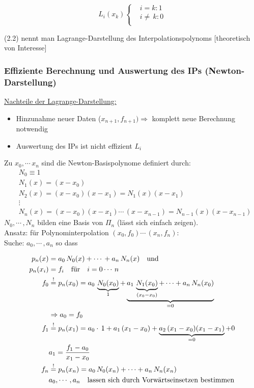 \begin{equation*} 
  L_i(x_k)
	\left\{  
  \begin{aligned} 
   & i=k: 1 \\ 
   & i\neq\,k: 0\\
  \end{aligned} 
	\right.
\end{equation*} 

(2.2) nennt man Lagrange-Darstellung des Interpolationspolynoms [theoretisch von Interesse]

\subsubsection{Effiziente Berechnung und Auswertung des IPs (Newton-Darstellung)}
\underline{Nachteile der Lagrange-Darstellung:}

\begin{itemize}
	\item Hinzunahme neuer Daten ($x_{n+1},f_{n+1}) \Rightarrow$ komplett neue Berechnung notwendig
	\item Auswertung des IPs ist nicht effizient $L_i$
\end{itemize}

Zu $x_0,\cdots\,x_n$ sind die Newton-Basispolynome definiert durch:\\

\begin{align*}
&N_0 \equiv 1\\
&N_1(x) = (x-x_0)\\
&N_2(x) = (x-x_0)(x-x_1)=N_1(x)(x-x_1)\\
&\vdots \\
&N_n(x) = (x-x_0)(x-x_1)\cdots\,(x-x_{n-1})=N_{n-1}(x)(x-x_{n-1})
\end{align*}
$N_0,\cdots\,,N_n$ bilden eine Basis von $\Pi_n$ (lässt sich einfach zeigen).\\
Ansatz: für Polynominterpolation $(x_0,f_0)\cdots\,(x_n,f_n)$:\\
Suche: $a_0,\cdots\,,a_n$ so dass 

\begin{align*}
p_n(x)&=a_0\,N_0(x) + \cdots\, + a_n\,N_n(x) \quad \text{und} \\
p_n(x_i)&= f_i \quad \text{für} \quad i=0\cdots\,n \\
f_0 &\overset{!}{=} p_n(x_0) = a_0\,\underbrace{N_0(x_0)}_{1} + \underbrace{a_1\,\underbrace{N_1(x_0)}_{(x_0-x_0)} + \cdots + a_n\,N_n(x_0)}_{=0} \\
& \Rightarrow a_0 = f_0 \\
f_1 &\overset{!}{=} p_n(x_1) = a_0\cdot\,1 + a_1\,(x_1-x_0) + \underbrace{a_2\,(x_1-x_0)(x_1-x_1)}_{=0} + 0  \\
& a_1 = \frac{f_1-a_0}{x_1-x_0}\\
f_n &\overset{!}{=} p_n(x_n) = a_0\,N_0(x_n) + \cdots + a_n\,N_n(x_n) \\
& a_0,\cdots\,,a_n \quad \text{lassen sich durch Vorwärtseinsetzen bestimmen}
\end{align*}\\

